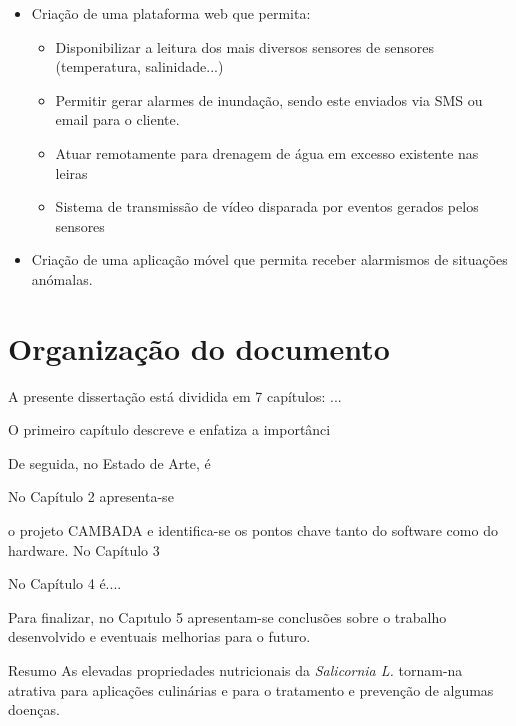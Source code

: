 \begin{itemize}
    \item Criação de uma plataforma web que permita: 

    \begin{itemize}
        \item Disponibilizar a leitura dos mais diversos sensores de sensores (temperatura, salinidade...)
        
        \item Permitir gerar alarmes de inundação, sendo este enviados via SMS ou email para o cliente. 
        
        \item Atuar remotamente para drenagem de água em excesso existente nas leiras
        
        \item Sistema de transmissão de vídeo disparada por eventos gerados pelos sensores
        
        
    \end{itemize}
    
    \item Criação de uma aplicação móvel que permita receber alarmismos de situações anómalas. 
\end{itemize}


\section{Organização do documento}


A presente dissertação está dividida em 7 capítulos: ...

O primeiro capítulo descreve e enfatiza a importânci

De seguida, no Estado de Arte, é




No Capítulo 2 apresenta-se 



o projeto CAMBADA e identifica-se os pontos chave tanto
do software como do hardware. No Capítulo 3 


No Capítulo 4 é.... 

Para finalizar, no Capıtulo 5 apresentam-se conclusões sobre o trabalho desenvolvido e eventuais melhorias para o futuro.



Resumo
As elevadas propriedades nutricionais da \textit{Salicornia L.} tornam-na atrativa para aplicações culinárias e para o tratamento e prevenção de algumas doenças.






